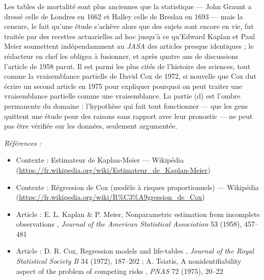 \documentclass[11pt]{article}
\newenvironment{refs}{\par\small\noindent\emph{Références :}\begin{itemize}\setlength\itemsep{0pt}}{\end{itemize}\normalsize}
\begin{document}
\noindent Les tables de mortalité sont plus anciennes que la statistique --- John Graunt a
dressé celle de Londres en 1662 et Halley celle de Breslau en 1693 --- mais la censure, le fait
qu'une étude s'achève alors que des sujets sont encore en vie, fut traitée par des recettes
actuarielles ad hoc jusqu'à ce qu'Edward Kaplan et Paul Meier soumettent indépendamment au
\textit{JASA} des articles presque identiques ; le rédacteur en chef les obligea à fusionner, et après
quatre ans de discussions l'article de 1958 parut. Il est parmi les plus cités de l'histoire des
sciences, tout comme la vraisemblance partielle de David Cox de 1972, si nouvelle que Cox dut écrire
un second article en 1975 pour expliquer pourquoi on peut traiter une vraisemblance partielle comme
une vraisemblance. La partie (d) est l'ombre permanente du domaine : l'hypothèse qui fait tout
fonctionner --- que les gens quittent une étude pour des raisons sans rapport avec leur pronostic --- ne
peut pas être vérifiée sur les données, seulement argumentée.

\begin{refs}
\item Contexte : Estimateur de Kaplan-Meier --- Wikipédia (\url{https://fr.wikipedia.org/wiki/Estimateur_de_Kaplan-Meier})
\item Contexte : Régression de Cox (modèle à risques proportionnels) --- Wikipédia (\url{https://fr.wikipedia.org/wiki/R%C3%A9gression_de_Cox})
\item Article : E. L. Kaplan \& P. Meier, \og{} Nonparametric estimation from incomplete observations \fg{}, \textit{Journal of the American Statistical Association} 53 (1958), 457--481
\item Article : D. R. Cox, \og{} Regression models and life-tables \fg{}, \textit{Journal of the Royal Statistical Society B} 34 (1972), 187--202 ; A. Tsiatis, \og{} A nonidentifiability aspect of the problem of competing risks \fg{}, \textit{PNAS} 72 (1975), 20--22
\end{refs}

\bigskip
\end{document}
